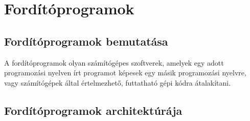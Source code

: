 
\chapter{Fordítóprogramok}

\section{Fordítóprogramok bemutatása}
A fordítóprogramok olyan számítógépes szoftverek, amelyek egy adott programozási nyelven írt programot képesek egy másik programozási nyelvre, vagy számítógépek által értelmezhető, futtatható gépi kódra átalakítani.

\section{Fordítóprogramok architektúrája}